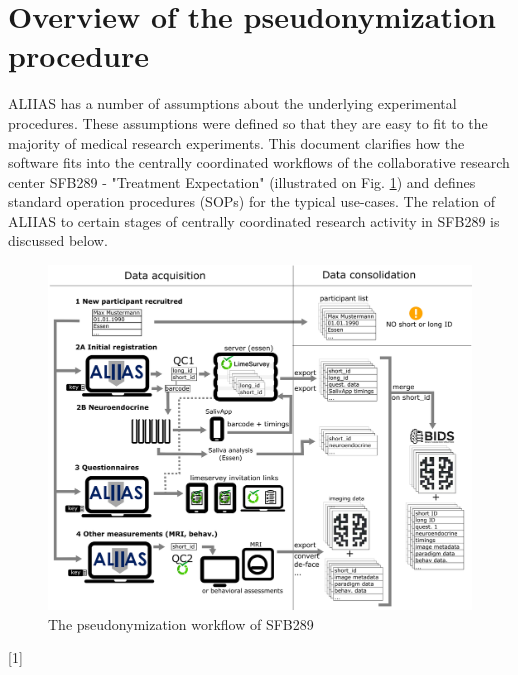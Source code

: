 \section{Overview of the pseudonymization procedure}
\label{section:overview}
ALIIAS has a number of assumptions about the underlying experimental procedures.  These assumptions were defined so that they are easy to fit to the majority of medical research experiments. This document clarifies how the software fits into the centrally coordinated workflows of the collaborative research center SFB289 - "Treatment Expectation" (illustrated on Fig. \ref{fig:flowchart}) and defines standard operation procedures (SOPs) for the typical use-cases.
The relation of ALIIAS to certain stages of centrally coordinated research activity in SFB289 is discussed below.

\begin{figure}[H]
\centering
\includegraphics[width=1.0\textwidth]{docs/fig/overview_v3.eps}
\caption{The pseudonymization workflow of SFB289}
\label{fig:flowchart}
\end{figure}

[1]

